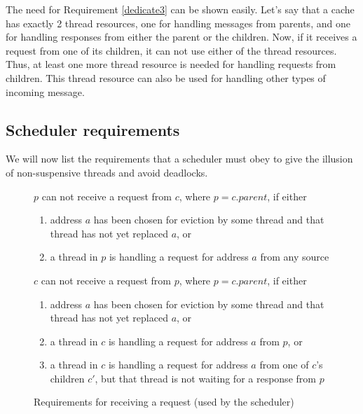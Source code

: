 The need for Requirement \ref{dedicate3} can be shown easily. Let's say that a
cache has exactly 2 thread resources, one for handling messages from parents,
and one for handling responses from either the parent or the children. Now, if
it receives a request from one of its children, it can not use either of the
thread resources. Thus, at least one more thread resource is needed for
handling requests from children. This thread resource can also be used for
handling other types of incoming message.

\subsection{Scheduler requirements}

We will now list the requirements that a scheduler must obey to give the
illusion of non-suspensive threads and avoid deadlocks.

\begin{figure}\small
\begin{requirement}
$p$ can not receive a request  from $c$, where $p = c.parent$,
if either
\begin{enumerate}
\item address $a$ has been chosen for eviction by some thread and that thread
has not yet replaced $a$, or
\item a thread in $p$ is handling a request for address
$a$ from any source
\end{enumerate}
\label{pHandleReq}
\end{requirement}
\begin{requirement}
$c$ can not receive a request  from $p$, where $p = c.parent$,
if either
\begin{enumerate}
\item address $a$ has been chosen for eviction by some thread and that thread
has not yet replaced $a$, or
\item a thread in $c$ is handling a request for address
$a$ from $p$, or
\item a thread in $c$ is handling a request for address
$a$ from one of $c$'s children $c'$, but that thread is not waiting for a
response from $p$
\end{enumerate}
\label{cHandleReq}
\end{requirement}
\caption{Requirements for receiving a request (used by the scheduler)}\label{recvReq}
\label{}
\end{figure}

